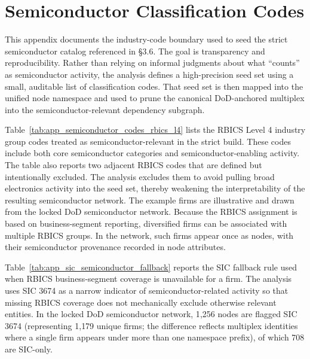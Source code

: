 \chapter{Semiconductor Classification Codes}
\label{app:semiconductor_classification_codes}

This appendix documents the industry-code boundary used to seed the strict semiconductor catalog referenced in \S3.6. The goal is transparency and reproducibility. Rather than relying on informal judgments about what ``counts'' as semiconductor activity, the analysis defines a high-precision seed set using a small, auditable list of classification codes. That seed set is then mapped into the unified node namespace and used to prune the canonical DoD-anchored multiplex into the semiconductor-relevant dependency subgraph.

Table~\ref{tab:app_semiconductor_codes_rbics_l4} lists the RBICS Level 4 industry group codes treated as semiconductor-relevant in the strict build. These codes include both core semiconductor categories and semiconductor-enabling activity. The table also reports two adjacent RBICS codes that are defined but intentionally excluded. The analysis excludes them to avoid pulling broad electronics activity into the seed set, thereby weakening the interpretability of the resulting semiconductor network. The example firms are illustrative and drawn from the locked DoD semiconductor network. Because the RBICS assignment is based on business-segment reporting, diversified firms can be associated with multiple RBICS groups. In the network, such firms appear once as nodes, with their semiconductor provenance recorded in node attributes.

Table~\ref{tab:app_sic_semiconductor_fallback} reports the SIC fallback rule used when RBICS business-segment coverage is unavailable for a firm. The analysis uses SIC 3674 as a narrow indicator of semiconductor-related activity so that missing RBICS coverage does not mechanically exclude otherwise relevant entities. In the locked DoD semiconductor network, 1{,}256 nodes are flagged SIC 3674 (representing 1{,}179 unique firms; the difference reflects multiplex identities where a single firm appears under more than one namespace prefix), of which 708 are SIC-only.


